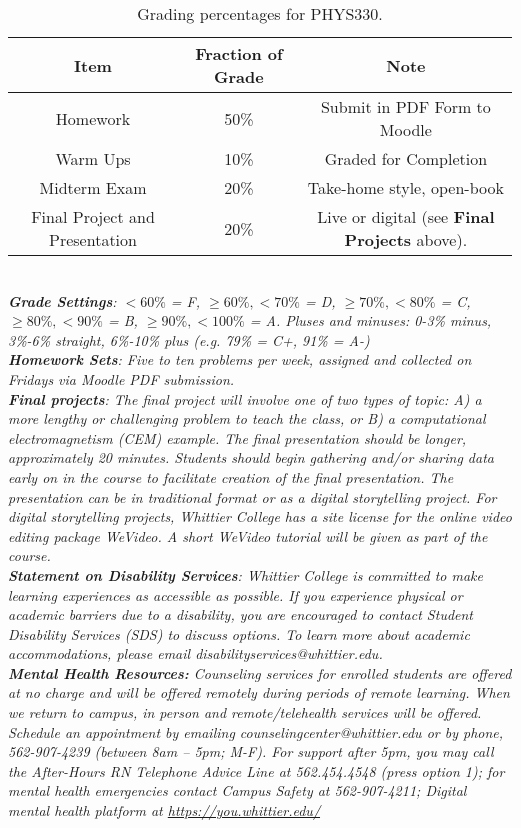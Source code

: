 \documentclass[10pt]{article}
\begin{document}
\begin{table}
\centering
\begin{tabular}{| c | c | c |}
\hline
Item & Fraction of Grade & Note \\ \hline
Homework & 50\% & Submit in PDF Form to Moodle \\ \hline
Warm Ups & 10\% & Graded for Completion \\ \hline
Midterm Exam & 20\% & Take-home style, open-book \\ \hline
Final Project and Presentation & 20\% & Live or digital (see \textbf{Final Projects} above). \\ \hline
\end{tabular}
\caption{\label{tab:grading} Grading percentages for PHYS330.}
\end{table} \\
\textit{\textbf{Grade Settings}: $<60\%$ = F, $\geq 60\%, <70\%$ = D, $\geq 70\%, <80\%$ = C, $\geq 80\%, <90\%$ = B, $\geq 90\%, <100\%$ = A.  Pluses and minuses: 0-3\% minus, 3\%-6\% straight, 6\%-10\% plus (e.g. 79\% = C+, 91\% = A-)} \\
\textit{\textbf{Homework Sets}: Five to ten problems per week, assigned and collected on Fridays via Moodle PDF submission.} \\
\textit{\textbf{Final projects}: The final project will involve one of two types of topic: A) a more lengthy or challenging problem to teach the class, or B) a computational electromagnetism (CEM) example.  The final presentation should be longer, approximately 20 minutes.  Students should begin gathering and/or sharing data early on in the course to facilitate creation of the final presentation.  The presentation can be in traditional format or as a digital storytelling project.  For digital storytelling projects, Whittier College has a site license for the online video editing package WeVideo.  A short WeVideo tutorial will be given as part of the course.} \\
\textit{\textbf{Statement on Disability Services}: Whittier College is committed to make learning experiences as accessible as possible. If you experience physical or academic barriers due to a disability, you are encouraged to contact Student Disability Services (SDS) to discuss options. To learn more about academic accommodations, please email disabilityservices@whittier.edu.} \\
\textit{\textbf{Mental Health Resources:} Counseling services for enrolled students are offered at no charge and will be offered remotely during periods of remote learning. When we return to campus, in person and remote/telehealth services will be offered. Schedule an appointment by emailing counselingcenter@whittier.edu  or by phone, 562-907-4239 (between 8am – 5pm; M-F). For support after 5pm, you may call the After-Hours RN Telephone Advice Line at 562.454.4548 (press option 1); for mental health emergencies contact Campus Safety at 562-907-4211; Digital mental health platform at \url{https://you.whittier.edu/}} \\ \\
\end{document}
